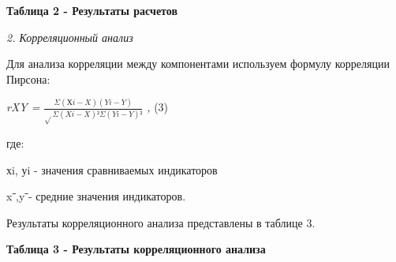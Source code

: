 {{\bfseries Таблица 2 - Результаты расчетов}


\emph{2. Корреляционный анализ}

Для анализа корреляции между компонентами используем формулу корреляции
Пирсона:

\emph{rXY =}
\(\frac{\Sigma(Хi - X)(Yi - Y)}{\sqrt{}\Sigma(Xi - X)²\Sigma(Yi - Y)²}\)
\emph{,} (3)

где:

хi, уi - значения сравниваемых индикаторов

xˉ,yˉ- средние значения индикаторов.

Результаты корреляционного анализа представлены в таблице 3.

{\bfseries Таблица 3 - Результаты корреляционного анализа}

}
